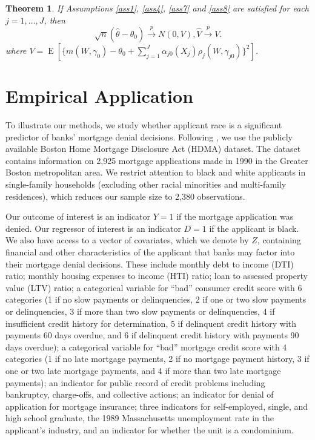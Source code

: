 \documentclass[aos]{imsart}
\numberwithin{equation}{section}
\theoremstyle{plain}
\newtheorem{theorem}{Theorem}[section]
\theoremstyle{remark}
\DeclareMathOperator{\E}{E}
\begin{document}
\begin{theorem} \label{thm2nonlin}
    If Assumptions \ref{ass1}, \ref{ass4}, \ref{ass7} and \ref{ass8} are satisfied %
    for each $j = 1, \ldots, J$, then
\[
\sqrt{n}(\hat{\theta}-\theta_{0})\overset{p}{\to}N(0,V),\text{
}\hat{V}\overset{p}{\to}V.
\]
where $V=\E[\{m(W,\gamma_{0})-\theta_{0}+\sum_{j=1}^{J}\alpha_{j0}(X_{j}%
)\rho_{j}(W,\gamma_{j0})\}^{2}]$.
\end{theorem}

\section{Empirical Application \label{sec:empir}}
To illustrate our methods, we study whether applicant race is a significant predictor of banks' mortgage denial decisions. Following \cite{munnell1996mortgage}, we use the publicly available Boston Home Mortgage Disclosure Act (HDMA) dataset. The dataset contains information on 2,925 mortgage applications made in 1990 in the Greater Boston metropolitan area. We restrict attention to black and white applicants in single-family households (excluding other racial minorities and multi-family residences), which reduces our sample size to 2,380 observations.

Our outcome of interest is an indicator $Y = 1$ if the mortgage application was denied. Our regressor of interest is an indicator $D = 1$ if the applicant is black. We also have access to a vector of covariates, which we denote by $Z$, containing financial and other characteristics of the applicant that banks may factor into their mortgage denial decisions. These include monthly debt to income (DTI) ratio; monthly housing expenses to income (HTI) ratio; loan to assessed property value (LTV) ratio; a categorical variable for ``bad'' consumer credit score with 6 categories (1 if no slow payments or delinquencies, 2 if one or two slow payments or delinquencies, 3 if more than two slow payments or delinquencies, 4 if insufficient credit history for determination, 5 if delinquent credit history with payments 60 days overdue, and 6 if delinquent credit history with payments 90 days overdue); a categorical variable for ``bad'' mortgage credit score with 4 categories (1 if no late mortgage payments, 2 if no mortgage payment history, 3 if one or two late mortgage payments, and 4 if more than two late mortgage payments); an indicator for public record of credit problems including bankruptcy, charge-offs, and collective actions; an indicator for denial of application for mortgage insurance; three indicators for self-employed, single, and high school graduate, the 1989 Massachusetts unemployment rate in the applicant's industry, and an indicator for whether the unit is a condominium.
\end{document}
